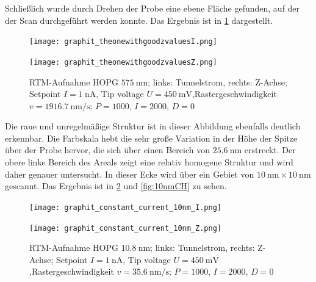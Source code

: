 Schließlich wurde durch Drehen der Probe eine ebene Fläche gefunden, auf der der Scan durchgeführt werden konnte. Das Ergebnis ist in \cref{fig:hopg_good} dargestellt. 

\begin{figure}[H]
    \centering
    \begin{minipage}[t]{0.495\textwidth}
        \centering
        \texttt{[image: graphit\_theonewithgoodzvaluesI.png]}
    \end{minipage}
    \hfill
    \begin{minipage}[t]{0.495\textwidth}
        \centering
        \texttt{[image: graphit\_theonewithgoodzvaluesZ.png]}
    \end{minipage}
    \caption{
      RTM-Aufnahme HOPG $\SI{575}{\nm}$; links: Tunnelstrom, rechts: Z-Achse; Setpoint $I = \SI{1}{\nano\ampere}$, Tip voltage $U = \SI{450}{\milli\volt}$,Rastergeschwindigkeit $v = \SI{1916.7}{\nano\meter\per\second}$; $P = 1000$, $I = 2000$, $D = 0$
}
    \label{fig:hopg_good}
\end{figure}

Die raue und unregelmäßige Struktur ist in dieser Abbildung ebenfalls deutlich erkennbar. Die Farbskala hebt die sehr große Variation in der Höhe der Spitze über der Probe hervor, die sich über einen Bereich von $\SI{25.6}{\nm}$ erstreckt. 
Der obere linke Bereich des Areals zeigt eine relativ homogene Struktur und wird daher genauer untersucht. In dieser Ecke wird über ein Gebiet von $\SI{10}{\nm} \times \SI{10}{\nm}$ gescannt. Das Ergebnis ist in \cref{fig:10nmCC} und \cref{fig:10nmCH} zu sehen.

\begin{figure}[H]
    \centering
    \begin{minipage}[t]{0.495\textwidth}
        \centering
        \texttt{[image: graphit\_constant\_current\_10nm\_I.png]}
    \end{minipage}
    \hfill
    \begin{minipage}[t]{0.495\textwidth}
        \centering
        \texttt{[image: graphit\_constant\_current\_10nm\_Z.png]}
    \end{minipage}
    \caption{
      RTM-Aufnahme HOPG $\SI{10.8}{\nm}$; links: Tunnelstrom, rechts: Z-Achse; Setpoint $I = \SI{1}{\nano\ampere}$, Tip voltage $U = \SI{450}{\milli\volt}$,Rastergeschwindigkeit $v = \SI{35.6}{\nano\meter\per\second}$; $P = 1000$, $I = 2000$, $D = 0$
}
    \label{fig:10nmCC}
\end{figure}

